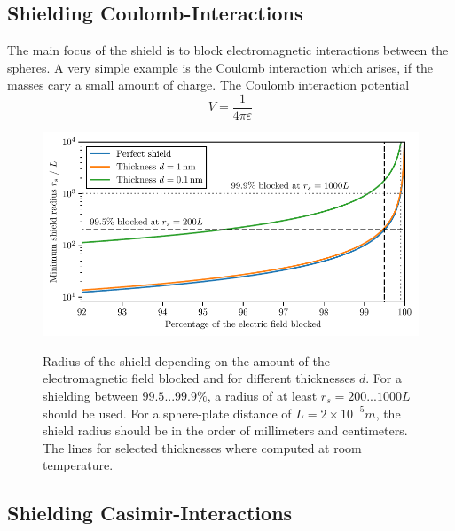 \subsection{Shielding Coulomb-Interactions}
The main focus of the shield is to block electromagnetic interactions between the spheres. A very simple example is the Coulomb interaction which arises, if the masses cary a small amount of charge. 
The Coulomb interaction potential
\begin{equation}
  V = \frac{1}{4\pi\varepsilon}
\end{equation}

\begin{figure}[!htbp]
  \centering
  \includegraphics[width=\textwidth]{./../figures/shield-radius.pdf}
  \label{fig:4:shield-radius}
  \caption{Radius of the shield depending on the amount of the electromagnetic field blocked and for different thicknesses $d$. For a shielding between $99.5...99.9\%$, a radius of at least $r_s =200...1000L$ should be used. For a sphere-plate distance of $L=2 \times 10^{-5}\si{m}$, the shield radius should be in the order of millimeters and centimeters. The lines for selected thicknesses where computed at room temperature.}
\end{figure}



\subsection{Shielding Casimir-Interactions}



